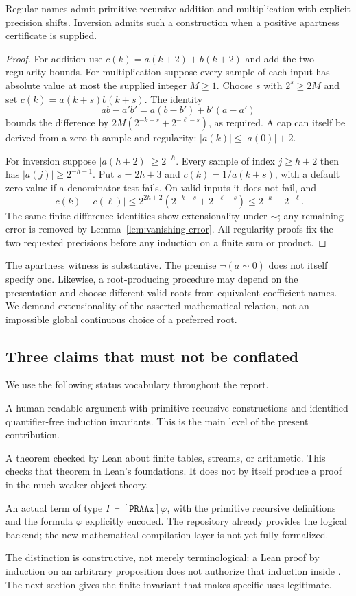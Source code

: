 \begin{proposition}
\label{prop:name-arithmetic}
Regular names admit primitive recursive addition and multiplication with
explicit precision shifts. Inversion admits such a construction when a
positive apartness certificate is supplied.
\end{proposition}
\begin{proof}
For addition use $c(k)=a(k+2)+b(k+2)$ and add the two regularity bounds.
For multiplication suppose every sample of each input has absolute value
at most the supplied integer $M\ge1$. Choose $s$ with $2^s\ge2M$ and set
$c(k)=a(k+s)b(k+s)$. The identity
\[
 ab-a'b'=a(b-b')+b'(a-a')
\]
bounds the difference by $2M(2^{-k-s}+2^{-\ell-s})$, as required.
A cap can itself be derived from a zero-th sample and regularity:
$|a(k)|\le|a(0)|+2$.

For inversion suppose $|a(h+2)|\ge2^{-h}$. Every sample of index
$j\ge h+2$ then has $|a(j)|\ge2^{-h-1}$. Put $s=2h+3$ and
$c(k)=1/a(k+s)$, with a default zero value if a denominator test fails.
On valid inputs it does not fail, and
\[
 |c(k)-c(\ell)|\le
   2^{2h+2}(2^{-k-s}+2^{-\ell-s})
   \le2^{-k}+2^{-\ell}.
\]
The same finite difference identities show extensionality under $\sim$;
any remaining error is removed by Lemma~\ref{lem:vanishing-error}.
All regularity proofs fix the two requested precisions before any
induction on a finite sum or product.
\end{proof}

The apartness witness is substantive. The premise $\neg(a\sim0)$ does
not itself specify one. Likewise, a root-producing procedure may depend
on the presentation and choose different valid roots from equivalent
coefficient names. We demand extensionality of the asserted mathematical
relation, not an impossible global continuous choice of a preferred root.

\subsection{Three claims that must not be conflated}

We use the following status vocabulary throughout the report.
\begin{description}[style=nextline]
\item[Mathematical derivation in the stated arithmetic.]
A human-readable argument with primitive recursive constructions and
identified quantifier-free induction invariants. This is the main level
of the present contribution.
\item[Ambient Lean verification.]
A theorem checked by Lean about finite tables, streams, or arithmetic.
This checks that theorem in Lean's foundations. It does not by itself
produce a proof in the much weaker object theory.
\item[Deep iPRA verification.]
An actual term of type $\Gamma\mathbin{\vdash}[\mathtt{PRAAx}]\varphi$,
with the primitive recursive definitions and the formula $\varphi$
explicitly encoded. The repository already provides the logical backend;
the new mathematical compilation layer is not yet fully formalized.
\end{description}

The distinction is constructive, not merely terminological: a Lean proof
by induction on an arbitrary proposition does not authorize that induction
inside \iPRA. The next section gives the finite invariant that makes
specific uses legitimate.
